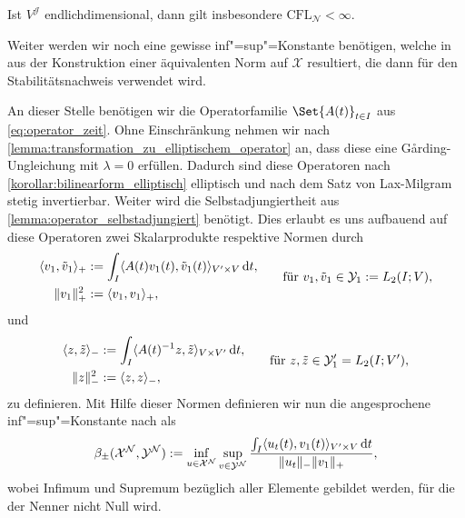 \documentclass[../main.tex]{subfiles}
\begin{document}
\begin{Bemerkung}
    Ist $V^{\mathcal J}$ endlichdimensional, dann gilt insbesondere $\mathrm{CFL}_{\mathcal N} < \infty$.
\end{Bemerkung}

Weiter werden wir noch eine gewisse inf"=sup"=Konstante benötigen, welche in \cite[57]{Andreev:2012ep} aus der Konstruktion einer äquivalenten Norm auf $\mathcal X$ resultiert, die dann für den Stabilitätsnachweis \cite[Theorem 5.2.6]{Andreev:2012ep} verwendet wird.

An dieser Stelle benötigen wir die Operatorfamilie $\Set{A(t)}_{t \in I}$ aus \cref{eq:operator_zeit}.
Ohne Einschränkung nehmen wir nach \cref{lemma:transformation_zu_elliptischem_operator} an, dass diese eine G\aa{}rding-Ungleichung mit $\lambda = 0$ erfüllen.
Dadurch sind diese Operatoren nach \cref{korollar:bilinearform_elliptisch} elliptisch und nach dem Satz von Lax-Milgram \cite[Section 6.2.1]{evans2010partial} stetig invertierbar.
Weiter wird die Selbstadjungiertheit aus \cref{lemma:operator_selbstadjungiert} benötigt.
Dies erlaubt es uns aufbauend auf diese Operatoren zwei Skalarprodukte respektive Normen durch
\begin{equation}
    \begin{aligned}
        \langle v_{1},\tilde{v}_{1}\rangle_{+} &:= \int_{I} \langle A(t)v_{1}(t),\tilde{v}_{1}(t)\rangle_{V' \times V} \mathop{}\!\mathrm{d} t, \\
         \lVert v_{1}\rVert^{2}_{+} &:= \langle v_{1},v_{1}\rangle_{+},
    \end{aligned}
    \qquad \text{für } v_{1}, \tilde{v}_{1} \in \mathcal Y_{1} := L_{2}(I; V),
\end{equation}
und
\begin{equation}
    \begin{aligned}
        \langle z,\tilde{z}\rangle_{-} &:= \int_{I} \langle A(t)^{-1} z,\tilde z\rangle_{V \times V'} \mathop{}\!\mathrm{d} t, \\
        \lVert z\rVert_{-}^{2} &:= \langle z,z\rangle_{-},
    \end{aligned}
    \qquad \text{für } z, \tilde z \in \mathcal Y_{1}' = L_{2}(I; V'),
\end{equation}
zu definieren.
Mit Hilfe dieser Normen definieren wir nun die angesprochene inf"=sup"=Konstante nach \cite[57]{Andreev:2012ep} als
\begin{equation}
    \beta_{\pm}(\mathcal X^{\mathcal N}, \mathcal Y^{\mathcal N}) := \inf_{u \in \mathcal X^{\mathcal N}} \sup_{v \in \mathcal Y^{\mathcal N}} \frac{\int_{I} \langle u_t(t),v_{1}(t)\rangle_{V' \times V} \mathop{}\!\mathrm{d} t}{\lVert u_t\rVert_{-} \lVert v_{1}\rVert_{+}},
\end{equation}
wobei Infimum und Supremum bezüglich aller Elemente gebildet werden, für die der Nenner nicht Null wird.
\end{document}
